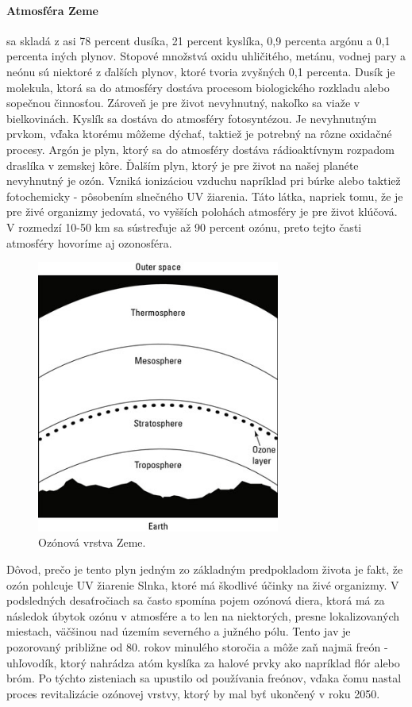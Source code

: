 \paragraph{Atmosféra Zeme} sa skladá z asi 78 percent dusíka, 21 percent kyslíka, 0,9 percenta argónu a 0,1 percenta iných plynov. Stopové množstvá oxidu uhličitého, metánu, vodnej pary a neónu sú niektoré z ďalších plynov, ktoré tvoria zvyšných 0,1 percenta. Dusík je molekula, ktorá sa do atmosféry dostáva procesom biologického rozkladu alebo sopečnou činnosťou. Zároveň je pre život nevyhnutný, nakoľko sa viaže v bielkovinách. Kyslík sa dostáva do atmosféry fotosyntézou. Je nevyhnutným prvkom, vďaka ktorému môžeme dýchať, taktiež je potrebný na rôzne oxidačné procesy. Argón je plyn, ktorý sa do atmosféry dostáva rádioaktívnym rozpadom draslíka v zemskej kôre. 
Ďalším plyn, ktorý je pre život na našej planéte nevyhnutný je ozón. Vzniká ionizáciou vzduchu napríklad pri búrke alebo taktiež fotochemicky - pôsobením slnečného UV žiarenia. Táto látka, napriek tomu, že je pre živé organizmy jedovatá, vo vyšších polohách atmosféry je pre život klúčová. V rozmedzí 10-50 km sa sústreďuje až 90 percent ozónu, preto tejto časti atmosféry hovoríme aj ozonosféra. 
\begin{figure}[!htbp]
  \centering
  \includegraphics[width=8cm]{img/ozone.jpg}
  \caption{Ozónová vrstva Zeme.}
  \label{numModel}
\end{figure}
\newline Dôvod, prečo je tento plyn jedným zo základným predpokladom života je fakt, že ozón pohlcuje UV žiarenie Slnka, ktoré má škodlivé účinky na živé organizmy. V podsledných desaťročiach sa často spomína pojem ozónová diera, ktorá má za následok úbytok ozónu v atmosfére a to len na niektorých, presne lokalizovaných miestach, väčšinou nad územím severného a južného pólu. Tento jav je pozorovaný približne od 80. rokov minulého storočia a môže zaň najmä freón - uhľovodík, ktorý nahrádza atóm kyslíka za halové prvky ako napríklad flór alebo bróm. Po týchto zisteniach sa upustilo od používania freónov, vďaka čomu nastal proces revitalizácie ozónovej vrstvy, ktorý by mal byť ukončený v roku 2050.


